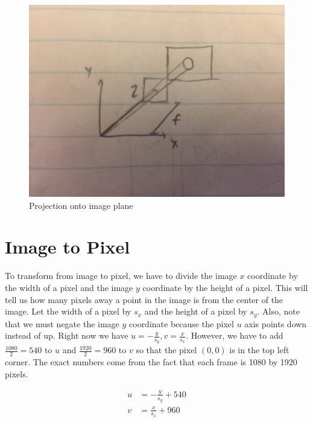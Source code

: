 \documentclass{article}
\begin{document}
\begin{figure}[H]
\includegraphics[scale=0.6]{Image_Plane}
\centering
\caption{Projection onto image plane}
\end{figure}

\section{Image to Pixel}
To transform from image to pixel, we have to divide the image $x$ coordinate by the width of a pixel and the image $y$ coordinate by the height of a pixel. This will tell us how many pixels away a point in the image is from the center of the image. Let the width of a pixel by $s_{x}$ and the height of a pixel by $s_{y}$. Also, note that we must negate the image $y$ coordinate because the pixel $u$ axis points down instead of up. Right now we have $u=-\frac{y}{s_y}, v=\frac{x}{s_x}$. However, we have to add $\frac{1080}{2}=540$ to $u$ and $\frac{1920}{2}=960$ to $v$ so that the pixel $(0,0)$ is in the top left corner. The exact numbers come from the fact that each frame is 1080 by 1920 pixels.

\begin{align*}
u&=-\frac{y}{s_{y}}+540 \\
v&=\frac{x}{s_{x}}+960
\end{align*}
\end{document}

